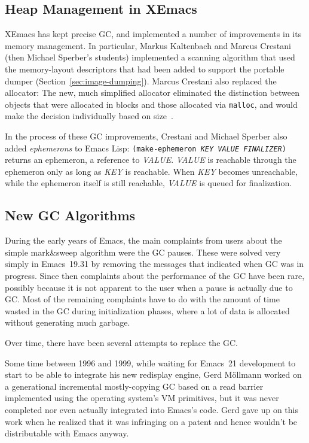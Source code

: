 \documentclass[format=acmsmall,screen]{acmart}
\newcommand \Elisp {Emacs Lisp}
\newcommand \id[1] {\textrm{\textsl{#1}}}
\begin{document}
\subsection{Heap Management in XEmacs}
\label{sec:heap-xemacs}

XEmacs has kept precise GC, and implemented a number of improvements
in its memory management.  In particular, Markus Kaltenbach and Marcus
Crestani (then Michael Sperber's students)
implemented a scanning algorithm that used the memory-layout
descriptors that had been added to support the portable dumper (Section~\ref{sec:image-dumping}).
Marcus Crestani also replaced the
allocator: The new, much simplified allocator eliminated the
distinction between objects that were allocated in blocks and those
allocated via \texttt{malloc}, and would make the decision
individually based on size~\cite{Crestani2005}.

In the process of these GC improvements, Crestani and Michael Sperber
also added \emph{ephemerons} \cite{Hayes1997} to \Elisp{}: \texttt{(make-ephemeron
  \id{KEY} \id{VALUE} \id{FINALIZER})} returns an ephemeron, a reference
to \id{VALUE}.  \id{VALUE} is reachable through the ephemeron only as
long as \id{KEY} is reachable.  When \id{KEY} becomes unreachable, while
the ephemeron itself is still reachable, \id{VALUE} is queued for
finalization.

\subsection{New GC Algorithms}
\label{sec:gc-algorithms}

During the early years of Emacs, the main complaints from users about the
simple mark\&sweep algorithm were the GC pauses.  These were solved very
simply in Emacs~19.31 by removing the messages that indicated when GC was in
progress.  Since then complaints about the performance of the GC have been
rare, possibly because it is not apparent to the user when a pause is
actually due to GC.  Most of the remaining complaints have to do with
the amount of time wasted in the
GC during initialization phases, where a lot of data is allocated without
generating much garbage.

Over time, there have been several attempts to replace the GC.

Some time between 1996 and 1999, while waiting for Emacs~21 development to
start to be able to integrate his new redisplay engine, Gerd
Möllmann worked on a generational incremental mostly-copying GC based on
a read barrier implemented using the operating system's VM primitives, but
it was never completed nor even actually integrated into Emacs's code.
Gerd gave up on this work when he realized that it was infringing on
a patent and hence wouldn't be distributable with Emacs anyway.
\end{document}
